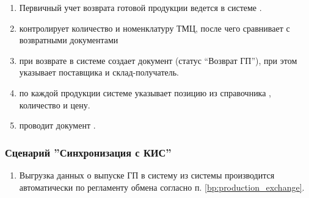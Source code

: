 \begin{enumerate}

\item Первичный учет возврата готовой продукции ведется в системе \gofro.
\item \kladovshik контролирует количество и номенклатуру ТМЦ, после чего сравнивает с возвратными документами
\item	\kladovshik при возврате в системе \gofro создает документ  (статус “Возврат ГП”), при этом указывает поставщика и склад-получатель.
\item	\kladovshik по каждой продукции системе \gofro указывает позицию из справочника , количество и цену.
\item	\kladovshik проводит документ .

\end{enumerate}


\subsubsection{Сценарий ''Синхронизация с КИС''}
\label{bp:goods_exchange}


\begin{enumerate}
\item Выгрузка данных о выпуске ГП в систему \erp из системы \gofro производится автоматически по регламенту обмена согласно п. \ref{bp:production_exchange}.




\end{enumerate}

